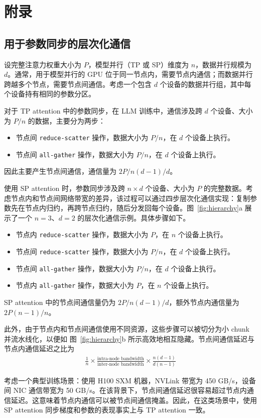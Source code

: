 \appendix


\section{附录}
\label{apdx}

\subsection{用于参数同步的层次化通信}
\label{apdx:hierarchical}

设完整注意力权重大小为 $P$，模型并行（TP 或 SP）维度为 $n$，数据并行规模为 $d$。通常，用于模型并行的 GPU 位于同一节点内，需要节点内通信；而数据并行跨越多个节点，需要节点间通信。考虑一个包含 $d$ 个设备的数据并行组，其中每个设备持有相同的参数分区。

对于 TP attention 中的参数同步，在 LLM 训练中，通信涉及跨 $d$ 个设备、大小为 $P/n$ 的数据，主要分为两步：
\begin{itemize}[leftmargin=*]
    \item 节点间 \texttt{reduce-scatter} 操作，数据大小为 $P/n$，在 $d$ 个设备上执行。
    \item 节点间 \texttt{all-gather} 操作，数据大小为 $P/n$，在 $d$ 个设备上执行。
\end{itemize}
因此主要产生节点间通信，通信量为 $2P/n(d-1)/d$。

使用 SP attention 时，参数同步涉及跨 $n \times d$ 个设备、大小为 $P$ 的完整数据。考虑节点内和节点间网络带宽的差异，该过程可以通过四步层次化通信实现：复制参数先在节点内归约，再跨节点归约，随后分发回每个设备。图~\ref{fig:hierarchy}a 展示了一个 $n=3$、$d=2$ 的层次化通信示例。具体步骤如下。
\begin{itemize}[leftmargin=*]
    \item 节点内 \texttt{reduce-scatter} 操作，数据大小为 $P$，在 $n$ 个设备上执行。
    \item 节点间 \texttt{reduce-scatter} 操作，数据大小为 $P/n$，在 $d$ 个设备上执行。
    \item 节点间 \texttt{all-gather} 操作，数据大小为 $P/n$，在 $d$ 个设备上执行。
    \item 节点内 \texttt{all-gather} 操作，数据大小为 $P$，在 $n$ 个设备上执行。
\end{itemize}
SP attention 中的节点间通信量仍为 $2P/n(d-1)/d$，额外节点内通信量为 $2P(n-1)/n$。

此外，由于节点内和节点间通信使用不同资源，这些步骤可以被切分为小 chunk 并流水线化，以便如 图~\ref{fig:hierarchy}b 所示高效地相互隐藏。节点间通信延迟与节点内通信延迟之比为
\begin{align} \label{eq:ratio}
    \frac{1}{n} \times \frac{\text{intra-node bandwidth}}{\text{inter-node bandwidth}} \times \frac{n(d-1)}{d(n-1)}
\end{align}

考虑一个典型训练场景：使用 H100 SXM 机器，NVLink 带宽为 450 GB/s，设备间 NIC 通信带宽为 50 GB/s。在该背景下，节点间通信延迟很容易超过节点内通信延迟。这意味着节点内通信可以被节点间通信掩盖。因此，在这类场景中，使用 SP attention 同步梯度和参数的表现事实上与 TP attention 一致。

